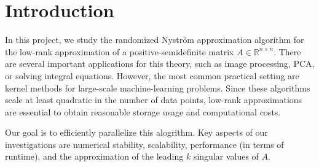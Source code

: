 \documentclass[a4paper, 12pt,oneside]{article}
\begin{document}
 
	 
	\clearpage
	\tableofcontents
	\thispagestyle{empty}
	\clearpage
	\setcounter{page}{1}

	\section{Introduction}
	In this project, we study the randomized Nystr\"om approximation algorithm for the low-rank approximation of a positive-semidefinite matrix $A \in \mathbb{R}^{n \times n}$. There are several important applications for this theory, such as image processing, PCA, or solving integral equations. However, the most common practical setting are kernel methods for large-scale machine-learning problems. Since these algorithms scale at least quadratic in the number of data points, low-rank approximations are essential to obtain reasonable storage usage and computational costs.
	
	Our goal is to efficiently parallelize this alogrithm. Key aspects of our investigations are numerical stability, scalability, performance (in terms of runtime), and the approximation of the leading $k$ singular values of $A$.
\end{document}
